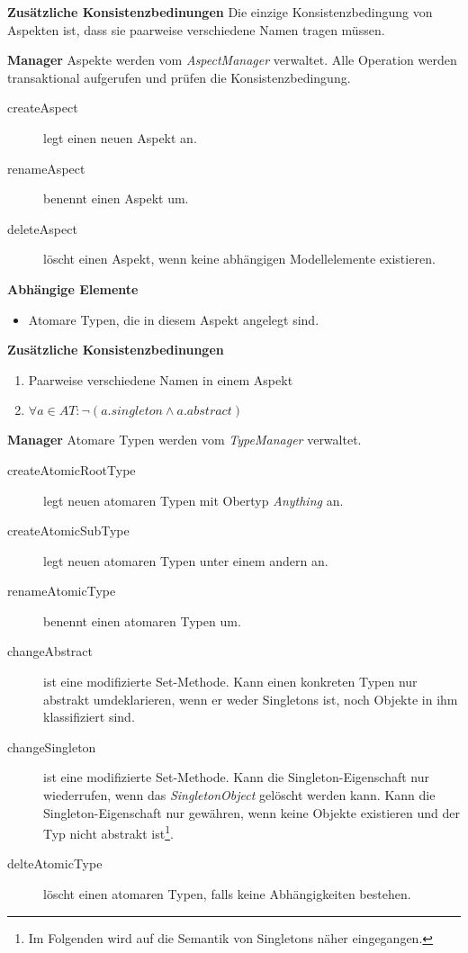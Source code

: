 
\textbf{Zusätzliche Konsistenzbedinungen} \newline
Die einzige Konsistenzbedingung von Aspekten ist, dass sie paarweise verschiedene Namen tragen müssen. 

\textbf{Manager} \newline
Aspekte werden vom \emph{AspectManager} verwaltet. Alle Operation werden transaktional aufgerufen und prüfen die Konsistenzbedingung. 

\begin{description}
\item[createAspect] legt einen neuen Aspekt an.
\item[renameAspect] benennt einen Aspekt um.
\item[deleteAspect] löscht einen Aspekt, wenn keine abhängigen Modellelemente existieren.
\end{description}

\textbf{Abhängige Elemente}
\begin{itemize}
	\item Atomare Typen, die in diesem Aspekt angelegt sind.
\end{itemize}

\newpage
{}

\textbf{Zusätzliche Konsistenzbedinungen}
\begin{enumerate}
  		\item Paarweise verschiedene Namen in einem Aspekt
  		\item \(\forall a \in AT : \lnot(a.singleton \land a.abstract) \)
\end{enumerate}

\textbf{Manager} \newline
Atomare Typen werden vom \emph{TypeManager} verwaltet. 

\begin{description}
\item[createAtomicRootType] legt neuen atomaren Typen mit Obertyp \emph{Anything} an. 
\item[createAtomicSubType] legt neuen atomaren Typen unter einem andern an. 
\item[renameAtomicType] benennt einen atomaren Typen um. 
\item[changeAbstract] ist eine modifizierte Set-Methode. Kann einen konkreten Typen nur abstrakt umdeklarieren, wenn er weder Singletons ist, noch 
Objekte in ihm klassifiziert sind.
\item[changeSingleton] ist eine modifizierte Set-Methode. Kann die Singleton-Eigenschaft nur wiederrufen, wenn das \emph{SingletonObject} gelöscht werden kann. 
 Kann die Singleton-Eigenschaft nur gewähren, wenn keine Objekte existieren und der Typ nicht abstrakt ist\footnote{Im Folgenden wird auf die Semantik von Singletons näher eingegangen.}. 
 \item[delteAtomicType] löscht einen atomaren Typen, falls keine Abhängigkeiten bestehen.
\end{description}

